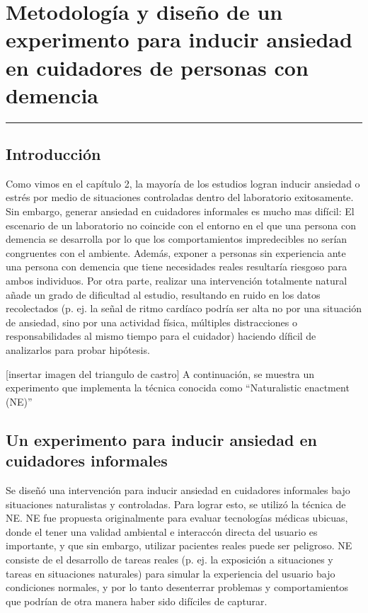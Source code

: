 \chapter{Metodolog\'ia y dise\~no de un experimento para inducir ansiedad en cuidadores de personas con demencia}\label{capit:cap3}
\vspace{-2.0325ex}%
\noindent
\rule{\textwidth}{0.5pt}
\vspace{-5.5ex}%
\newcommand{\pushline}{\Indp}%
\section{Introducci\'on}\label{secc:introduction}

Como vimos en el cap\'itulo 2, la mayor\'ia de los estudios logran inducir ansiedad o estr\'es por medio de situaciones controladas dentro del laboratorio exitosamente. Sin embargo, generar ansiedad en cuidadores informales es mucho mas dif\'icil: El escenario de un laboratorio no coincide con el entorno en el que una persona con demencia se desarrolla por lo que los comportamientos impredecibles no ser\'ian congruentes con el ambiente. Adem\'as, exponer a personas sin experiencia ante una persona con demencia que tiene necesidades reales resultar\'ia riesgoso para ambos individuos. Por otra parte, realizar una intervenci\'on totalmente natural a\~nade un grado de dificultad al estudio, resultando en ruido en los datos recolectados (p. ej. la se\~nal de ritmo card\'iaco podr\'ia ser alta no por una situaci\'on de ansiedad, sino por una actividad f\'isica, m\'ultiples distracciones o responsabilidades al mismo tiempo para el cuidador) haciendo d\'ificil de analizarlos para probar hip\'otesis.


[insertar imagen del triangulo de castro]
A continuaci\'on, se muestra un experimento que implementa la  t\'ecnica conocida como ``Naturalistic enactment (NE)'' \cite{Castro11}


\section{Un experimento para inducir ansiedad en cuidadores informales}
Se dise\~n\'o una intervenci\'on para inducir ansiedad en cuidadores informales bajo situaciones naturalistas y controladas. Para lograr esto, se utiliz\'o la t\'ecnica de NE. NE fue propuesta originalmente para evaluar tecnolog\'ias m\'edicas ubicuas, donde el tener una validad ambiental e interacc\'on directa del usuario es importante, y que sin embargo, utilizar pacientes reales puede ser peligroso. NE consiste de el desarrollo de tareas reales (p. ej. la exposici\'on a situaciones y tareas en situaciones naturales) para simular la experiencia del usuario bajo condiciones normales, y por lo tanto desenterrar problemas y comportamientos que podr\'ian de otra manera haber sido dif\'iciles de capturar.

